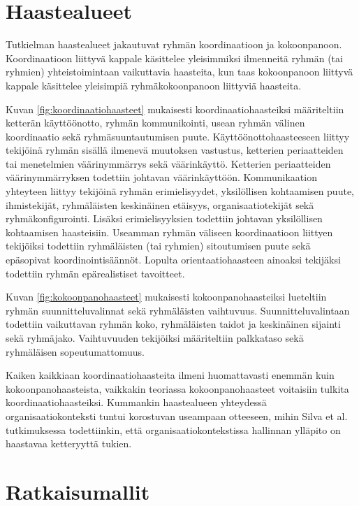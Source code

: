 \section{Haastealueet}

Tutkielman haastealueet jakautuvat ryhmän koordinaatioon ja kokoonpanoon. Koordinaatioon liittyvä kappale käsittelee yleisimmiksi ilmenneitä ryhmän (tai ryhmien) yhteistoimintaan vaikuttavia haasteita, kun taas kokoonpanoon liittyvä kappale käsittelee yleisimpiä ryhmäkokoonpanoon liittyviä haasteita. 

Kuvan \ref{fig:koordinaatiohaasteet} mukaisesti koordinaatiohaasteiksi määriteltiin ketterän käyttöönotto, ryhmän kommunikointi, usean ryhmän välinen koordinaatio sekä ryhmäsuuntautumisen puute. Käyttöönottohaasteeseen liittyy tekijöinä ryhmän sisällä ilmenevä muutoksen vastustus, ketterien periaatteiden tai menetelmien väärinymmärrys sekä väärinkäyttö. Ketterien periaatteiden väärinymmärryksen todettiin johtavan väärinkäyttöön. Kommunikaation yhteyteen liittyy tekijöinä ryhmän erimielisyydet, yksilöllisen kohtaamisen puute, ihmistekijät, ryhmäläisten keskinäinen etäisyys, organisaatiotekijät sekä ryhmäkonfigurointi. Lisäksi erimielisyyksien todettiin johtavan yksilöllisen kohtaamisen haasteisiin. Useamman ryhmän väliseen koordinaatioon liittyen tekijöiksi todettiin ryhmäläisten (tai ryhmien) sitoutumisen puute sekä epäsopivat koordinointisäännöt. Lopulta orientaatiohaasteen ainoaksi tekijäksi todettiin ryhmän epärealistiset tavoitteet.

Kuvan \ref{fig:kokoonpanohaasteet} mukaisesti kokoonpanohaasteiksi lueteltiin ryhmän suunnitteluvalinnat sekä ryhmäläisten vaihtuvuus. Suunnitteluvalintaan todettiin vaikuttavan ryhmän koko, ryhmäläisten taidot ja keskinäinen sijainti sekä ryhmäjako. Vaihtuvuuden tekijöiksi määriteltiin palkkataso sekä ryhmäläisen sopeutumattomuus. 

Kaiken kaikkiaan koordinaatiohaasteita ilmeni huomattavasti enemmän kuin kokoonpanohaasteista, vaikkakin teoriassa kokoonpanohaasteet voitaisiin tulkita koordinaatiohaasteiksi. Kummankin haastealueen yhteydessä organisaatiokonteksti tuntui korostuvan useampaan otteeseen, mihin Silva et al. \cite{SELLERISILVA201520} tutkimuksessa todettiinkin, että organisaatiokontekstissa hallinnan ylläpito on haastavaa ketteryyttä tukien.

\section{Ratkaisumallit}

